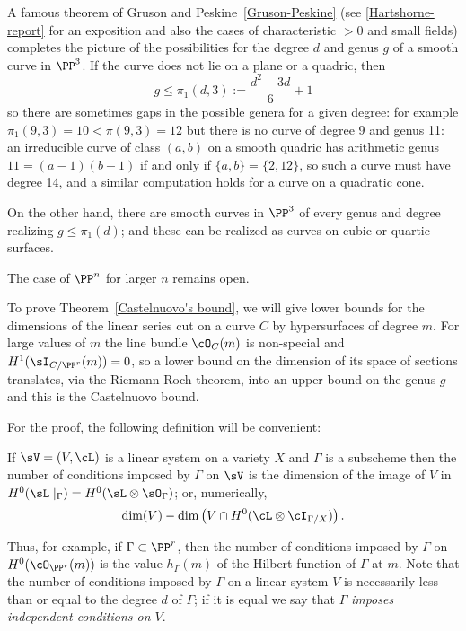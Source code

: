\begin{fact}
A famous theorem of Gruson and Peskine~\ref{Gruson-Peskine} (see \ref{Hartshorne-report} for an exposition and also the cases of characteristic $>0$ and small fields) completes the picture of the possibilities for the degree $d$ and  genus $g$  of a smooth curve in $\PP^3$. If the curve does not lie on a plane or a quadric, then
$$
g\leq \pi_1(d,3) := \frac{d^2-3d}{6} +1
$$
so there are  sometimes gaps in the possible genera for a given degree: for example  $\pi_1(9,3) = 10<\pi(9,3) =12$ but there is
no curve of degree 9 and genus 11: an irreducible curve of class $(a,b)$ on a smooth quadric has arithmetic genus $11 = (a-1)(b-1)$
if and only if $\{a,b\} = \{2,12\}$, so such a curve must have degree 14, and a similar computation holds for a curve on a quadratic cone.

On the other hand, there are smooth curves in $\PP^3$ of every genus and degree realizing $g\leq \pi_1(d)$; and these can be realized as curves
on cubic or quartic surfaces.

The case of $\PP^n$ for larger $n$ remains open. 
\end{fact}

To prove Theorem~\ref{Castelnuovo's bound}, we will give lower bounds for the dimensions of the linear series  cut on a curve $C$ by hypersurfaces of degree $m$. For large values of $m$ the line bundle $\cO_C(m)$ is non-special and $H^1(\sI_{C/\PP^r}(m)) = 0$, so a lower bound on the dimension of its space of sections translates, via the Riemann-Roch theorem, into an upper bound on the genus $g$ and this is the Castelnuovo bound.

For the proof, the following definition will be convenient:

\begin{definition}
If $\sV = (V,\cL)$ is a linear system on a variety $X$ and $\Gamma$ is a subscheme then the number of conditions
imposed by $\Gamma$ on $\sV$ is the dimension of the image of $V$ in $H^0(\sL\mid_\Gamma) = H^0(\sL \otimes \sO_\Gamma)$; or, numerically,
$$
\dim(V) - \dim \left(V \cap H^0(\cL\otimes \cI_{\Gamma/X}) \right).
$$\end{definition}

Thus, for example, if $\Gamma \subset \PP^r$, then the number of conditions imposed by $\Gamma$ on $H^0(\cO_{\PP^r}(m))$ is the value $h_\Gamma(m)$ of the Hilbert function of $\Gamma$ at $m$.
Note that the number of conditions imposed by $\Gamma$ on a linear system $V$ is necessarily less than or equal to the degree $d$ of $\Gamma$; if it is equal we say that $\Gamma$ \emph{imposes independent conditions on $V$}.

